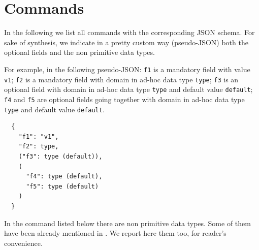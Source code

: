 \section{Commands}
\label{sec:commands}

In the following we list all commands with the corresponding JSON schema.
For sake of synthesis, we indicate in a pretty custom way (pseudo-JSON) both the optional fields and the non primitive data types.

For example, in the following pseudo-JSON: \texttt{f1} is a mandatory field with value \texttt{v1}; \texttt{f2} is a mandatory field with domain in ad-hoc data type \texttt{type}; \texttt{f3} is an optional field with domain in ad-hoc data type \texttt{type} and default value \texttt{default}; \texttt{f4} and \texttt{f5} are optional fields going together with domain in ad-hoc data type \texttt{type} and default value \texttt{default}.

\begin{verbatim}
  {
    "f1": "v1",
    "f2": type,
    ("f3": type (default)),
    (
      "f4": type (default),
      "f5": type (default)
    )
  }
\end{verbatim}

In the command listed below there are non primitive data types. Some of them have been already mentioned in . We report here them too, for reader's convenience.

